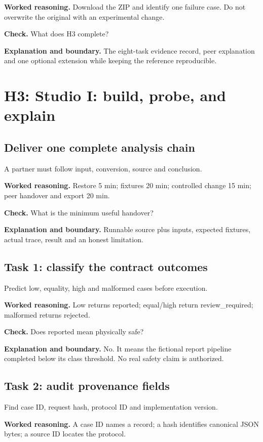 \textbf{Worked reasoning.} Download the ZIP and identify one failure case. Do not overwrite the original with an experimental change.

\textbf{Check.} What does H3 complete?

\textbf{Explanation and boundary.} The eight-task evidence record, peer explanation and one optional extension while keeping the reference reproducible.

\section{H3: Studio I: build, probe, and explain}
\subsection{Deliver one complete analysis chain}
A partner must follow input, conversion, source and conclusion.

\textbf{Worked reasoning.} Restore 5 min; fixtures 20 min; controlled change 15 min; peer handover and export 20 min.

\textbf{Check.} What is the minimum useful handover?

\textbf{Explanation and boundary.} Runnable source plus inputs, expected fixtures, actual trace, result and an honest limitation.

\subsection{Task 1: classify the contract outcomes}
Predict low, equality, high and malformed cases before execution.

\textbf{Worked reasoning.} Low returns reported; equal/high return review\_required; malformed returns rejected.

\textbf{Check.} Does reported mean physically safe?

\textbf{Explanation and boundary.} No. It means the fictional report pipeline completed below its class threshold. No real safety claim is authorized.

\subsection{Task 2: audit provenance fields}
Find case ID, request hash, protocol ID and implementation version.

\textbf{Worked reasoning.} A case ID names a record; a hash identifies canonical JSON bytes; a source ID locates the protocol.

